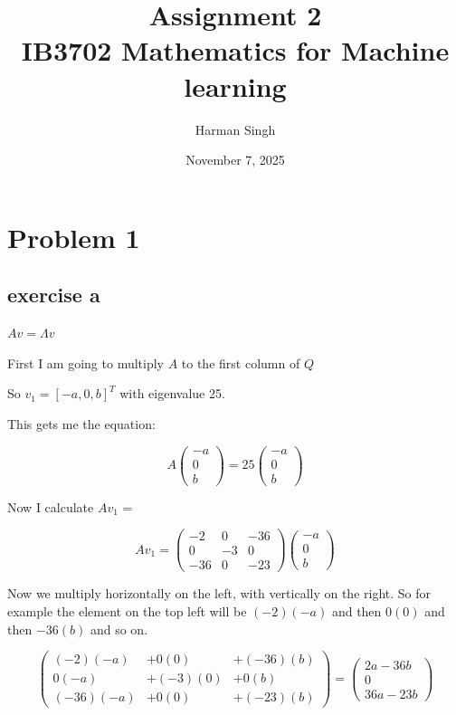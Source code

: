 \documentclass[11pt, a4paper]{article}
\title{Assignment 2 \\ IB3702 Mathematics for Machine learning}
\author{Harman Singh} %
\date{November 7, 2025} %
\begin{document}
\maketitle

\pagebreak
\pagebreak
\section*{Problem 1}

\subsection*{exercise a}

$Av = \Lambda v$

First I am going to multiply $A$ to the first column of $Q$

So $v_1 = {[-a, 0, b]}^T$ with eigenvalue 25.

This gets me the equation:

\[
A \begin{pmatrix}
	-a \\
	0 \\
	b
\end{pmatrix} = 25 \begin{pmatrix}
	-a \\
	0 \\
	b
\end{pmatrix}
\]

Now I calculate $Av_1$ = 

\[
Av_1 = 
\begin{pmatrix}
 -2 & 0 & -36 \\
 0 & -3 & 0 \\
 -36 & 0 & -23	
\end{pmatrix} \begin{pmatrix}
	-a \\
	0 \\
	b
\end{pmatrix}
\]

Now we multiply horizontally on the left, with vertically on the right. So for example the element on the top left will be $(-2)(-a)$ and then $0(0)$ and then $-36(b)$ and so on.

\[
\begin{pmatrix}
	(-2)(-a) & + 0(0) & + (-36)(b) \\
	0(-a) & + (-3)(0) & + 0(b) \\
	(-36)(-a) & + 0(0) & + (-23)(b)
\end{pmatrix} = 
\begin{pmatrix}
	2a - 36b \\
	0 \\
	36a - 23b
\end{pmatrix}
\]
\end{document}
